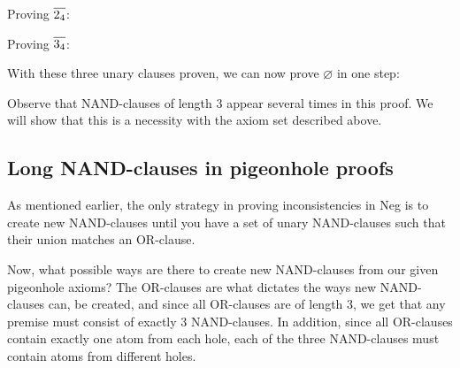 Proving $\ol{2_4}$:
\begin{prooftree*}[separation=0.8em, rule margin=1ex]
\end{prooftree*}

Proving $\ol{3_4}$:
\begin{prooftree*}[separation=0.8em, rule margin=1ex]
\end{prooftree*}

With these three unary clauses proven, we can now prove $\varnothing$ in one step:
\begin{prooftree*}[rule margin=1ex]
\end{prooftree*}

Observe that NAND-clauses of length 3 appear several times in this proof.
We will show that this is a necessity with the axiom set described above.
\subsection{Long NAND-clauses in pigeonhole proofs}
\label{sub:Long NAND-clauses in pigeonhole proofs}
As mentioned earlier, the only strategy in proving inconsistencies in Neg is to create new NAND-clauses until you have a set of unary NAND-clauses such that their union matches an OR-clause.

Now, what possible ways are there to create new NAND-clauses from our given pigeonhole axioms?
The OR-clauses are what dictates the ways new NAND-clauses can, be created, and since all OR-clauses are of length 3, we get that any premise must consist of exactly 3 NAND-clauses.
In addition, since all OR-clauses contain exactly one atom from each hole, each of the three NAND-clauses must contain atoms from different holes.

